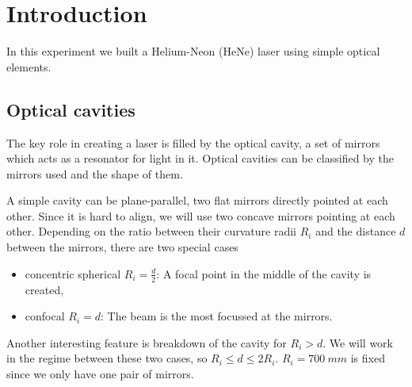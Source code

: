 \section{Introduction}
\label{sec:introduction}
In this experiment we built a Helium-Neon (HeNe) laser using simple optical elements.

\subsection{Optical cavities}
\label{sec:Optical cavities}
The key role in creating a laser is filled by the optical cavity, a set of mirrors which acts as a
resonator for light in it. Optical cavities can be classified by the mirrors used and the shape of
them.

A simple cavity can be plane-parallel, two flat mirrors directly pointed at each other. Since it is
hard to align, we will use two concave mirrors pointing at each other. Depending on the ratio
between their curvature radii $R_i$ and the distance $d$ between the mirrors, there are two special
cases
\begin{itemize}
  \item concentric spherical $R_i = \frac{d}{2}$: A focal point in the middle of the cavity is
    created,
  \item confocal $R_i = d$: The beam is the most focussed at the mirrors.
\end{itemize}
Another interesting feature is breakdown of the cavity for $R_i > d$. We will work in the regime between 
these two cases, so $R_i \leq d \leq 2R_i$. $R_i=\SI{700}{mm}$ is fixed since we only have one pair 
of mirrors.

